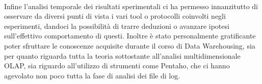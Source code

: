 \\
Infine l'analisi temporale dei risultati sperimentali ci ha permesso innanzitutto di osservare da diversi punti di vista i vari tool o protocolli coinvolti negli esperimenti, dandoci la possibilità di trarre deduzioni o avanzare ipotesi sull'effettivo comportamento di questi. Inoltre è stato personalmente gratificante poter sfruttare le conoscenze acquisite durante il corso di Data Warehousing, sia per quanto riguarda tutta la teoria sottostante all'analisi multidimensionale OLAP, sia riguardo all'utilizzo di strumenti come Pentaho, che ci hanno agevolato non poco tutta la fase di analisi dei file di log. 